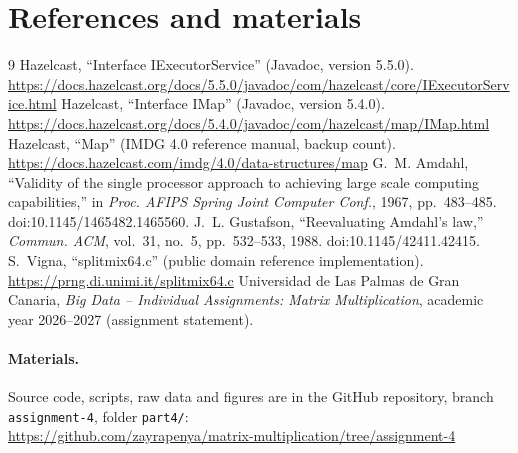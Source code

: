\documentclass[11pt,a4paper]{article}
\begin{document}
\section{References and materials}\label{sec:repro}
\begin{thebibliography}{9}
 Hazelcast, ``Interface IExecutorService'' (Javadoc, version 5.5.0).
  \url{https://docs.hazelcast.org/docs/5.5.0/javadoc/com/hazelcast/core/IExecutorService.html}
 Hazelcast, ``Interface IMap'' (Javadoc, version 5.4.0).
  \url{https://docs.hazelcast.org/docs/5.4.0/javadoc/com/hazelcast/map/IMap.html}
 Hazelcast, ``Map'' (IMDG 4.0 reference manual, backup count).
  \url{https://docs.hazelcast.com/imdg/4.0/data-structures/map}
 G.~M. Amdahl, ``Validity of the single processor approach to achieving large
  scale computing capabilities,'' in \emph{Proc. AFIPS Spring Joint Computer Conf.}, 1967,
  pp.~483--485. doi:10.1145/1465482.1465560.
 J.~L. Gustafson, ``Reevaluating Amdahl's law,'' \emph{Commun. ACM},
  vol.~31, no.~5, pp.~532--533, 1988. doi:10.1145/42411.42415.
 S.~Vigna, ``splitmix64.c'' (public domain reference implementation).
  \url{https://prng.di.unimi.it/splitmix64.c}
 Universidad de Las Palmas de Gran Canaria, \emph{Big Data -- Individual
  Assignments: Matrix Multiplication}, academic year 2026--2027 (assignment statement).
\end{thebibliography}

\paragraph{Materials.} Source code, scripts, raw data and figures are in the GitHub
repository, branch \texttt{assignment-4}, folder \texttt{part4/}:\\
\url{https://github.com/zayrapenya/matrix-multiplication/tree/assignment-4}
\end{document}
